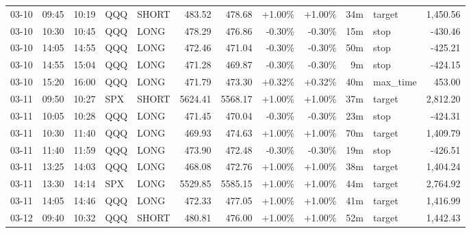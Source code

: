 \documentclass[11pt,a4paper,twoside]{article}
\begin{document}
\begin{center}
\begin{longtable}{>{\color{txtmain}}l l l l l r r r r r >{\color{txtmain}}l r}
03-10 & 09:45 & 10:19 & QQQ & SHORT & 483.52 & 478.68 & \textcolor{wingreen}{+1.00\%} & \textcolor{wingreen}{+1.00\%} & 34m & target & \textcolor{wingreen}{1,450.56} \\
03-10 & 10:30 & 10:45 & QQQ & LONG & 478.29 & 476.86 & \textcolor{lossred}{-0.30\%} & \textcolor{lossred}{-0.30\%} & 15m & stop & \textcolor{lossred}{-430.46} \\
03-10 & 14:05 & 14:55 & QQQ & LONG & 472.46 & 471.04 & \textcolor{lossred}{-0.30\%} & \textcolor{lossred}{-0.30\%} & 50m & stop & \textcolor{lossred}{-425.21} \\
03-10 & 14:55 & 15:04 & QQQ & LONG & 471.28 & 469.87 & \textcolor{lossred}{-0.30\%} & \textcolor{lossred}{-0.30\%} & 9m & stop & \textcolor{lossred}{-424.15} \\
03-10 & 15:20 & 16:00 & QQQ & LONG & 471.79 & 473.30 & \textcolor{wingreen}{+0.32\%} & \textcolor{wingreen}{+0.32\%} & 40m & max\_time & \textcolor{wingreen}{453.00} \\
03-11 & 09:50 & 10:27 & SPX & SHORT & 5624.41 & 5568.17 & \textcolor{wingreen}{+1.00\%} & \textcolor{wingreen}{+1.00\%} & 37m & target & \textcolor{wingreen}{2,812.20} \\
03-11 & 10:05 & 10:28 & QQQ & LONG & 471.45 & 470.04 & \textcolor{lossred}{-0.30\%} & \textcolor{lossred}{-0.30\%} & 23m & stop & \textcolor{lossred}{-424.31} \\
03-11 & 10:30 & 11:40 & QQQ & LONG & 469.93 & 474.63 & \textcolor{wingreen}{+1.00\%} & \textcolor{wingreen}{+1.00\%} & 70m & target & \textcolor{wingreen}{1,409.79} \\
03-11 & 11:40 & 11:59 & QQQ & LONG & 473.90 & 472.48 & \textcolor{lossred}{-0.30\%} & \textcolor{lossred}{-0.30\%} & 19m & stop & \textcolor{lossred}{-426.51} \\
03-11 & 13:25 & 14:03 & QQQ & LONG & 468.08 & 472.76 & \textcolor{wingreen}{+1.00\%} & \textcolor{wingreen}{+1.00\%} & 38m & target & \textcolor{wingreen}{1,404.24} \\
03-11 & 13:30 & 14:14 & SPX & LONG & 5529.85 & 5585.15 & \textcolor{wingreen}{+1.00\%} & \textcolor{wingreen}{+1.00\%} & 44m & target & \textcolor{wingreen}{2,764.92} \\
03-11 & 14:05 & 14:46 & QQQ & LONG & 472.33 & 477.05 & \textcolor{wingreen}{+1.00\%} & \textcolor{wingreen}{+1.00\%} & 41m & target & \textcolor{wingreen}{1,416.99} \\
03-12 & 09:40 & 10:32 & QQQ & SHORT & 480.81 & 476.00 & \textcolor{wingreen}{+1.00\%} & \textcolor{wingreen}{+1.00\%} & 52m & target & \textcolor{wingreen}{1,442.43} \\

\end{longtable}
\end{center}
\end{document}
